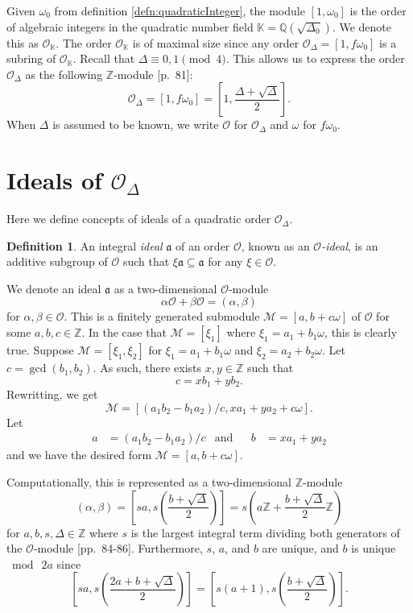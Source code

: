 \documentclass{ucalgthes1}
\theoremstyle{plain}
\theoremstyle{definition}
\newtheorem{defn}[thm]{Definition}
\newcommand{\KK}{\mathbb{K}}
\newcommand{\MM}{\mathcal{M}}
\newcommand{\OO}{\mathcal{O}}
\newcommand{\ZZ}{\mathbb{Z}}
\newcommand{\QQ}{\mathbb{Q}}
\begin{document}
\bigbreak
Given $\omega_0$ from definition \ref{defn:quadraticInteger}, the module $[1, \omega_0]$ is the order of algebraic integers in the quadratic number field $\KK=\QQ(\sqrt{\Delta_0})$.  We denote this as $\OO_{\KK}$.  The order $\OO_\KK$ is of maximal size since any order $\OO_\Delta = [1,f\omega_0]$ is a subring of $\OO_\KK$.  Recall that $\Delta \equiv 0,1 \pmod 4$.  This allows us to express the order $\OO_\Delta$ as the following $\ZZ$-module \cite{Jac09}[p.~81]:
\[
	\OO_\Delta = [1,f\omega_0] = \left[1, \frac{\Delta + \sqrt{\Delta}}{2} \right].
\]
When $\Delta$ is assumed to be known, we write $\OO$ for $\OO_\Delta$ and $\omega$ for $f\omega_0$.


\bigbreak
\section{Ideals of $\OO_\Delta$}

Here we define concepts of ideals of a quadratic order $\OO_\Delta$.

\begin{defn}
An integral \emph{ideal} $\mathfrak{a}$ of an order $\OO$, known as an \emph{$\OO$-ideal}, is an additive subgroup of $\OO$ such that $\xi \mathfrak{a} \subseteq \mathfrak{a}$ for any $\xi \in \OO$.
\end{defn}

We denote an ideal $\mathfrak{a}$ as a two-dimensional $\OO$-module
\[
	\alpha \OO + \beta \OO = (\alpha, \beta)
\]
for $\alpha, \beta \in \OO$.  This is a finitely generated submodule $\MM=[a,b+c\omega]$ of $\OO$ for some $a,b,c \in \ZZ$.  In the case that $\MM = [\xi_1]$ where $\xi_1 = a_1+b_1\omega$, this is clearly true.  Suppose $\MM = [\xi_1, \xi_2]$ for $\xi_1 = a_1 + b_1\omega$ and $\xi_2 = a_2+b_2\omega$.  Let $c = \gcd(b_1, b_2)$.  As such, there exists $x,y \in \ZZ$ such that 
\[
	c = xb_1 + yb_2.
\]
Rewritting, we get
\[
	\MM = [(a_1b_2-b_1a_2)/c, xa_1+ya_2+c\omega].
\]
Let
\begin{align*}
	a &= (a_1b_2-b_1a_2)/c &
	\mbox{and} &&
	b &= xa_1+ya_2
\end{align*}
and we have the desired form $\MM = [a, b+c\omega]$.


Computationally, this is represented as a two-dimensional $\ZZ$-module
\begin{equation}
\label{eq:idealZModule}
	(\alpha, \beta) = \left[sa, s\left( \frac{b+ \sqrt{\Delta}}{2} \right) \right] = s \left(a \ZZ + \frac{b + \sqrt{\Delta}}{2} \ZZ \right)
\end{equation}
for $a,b,s,\Delta \in \ZZ$ where $s$ is the largest integral term dividing both generators of the $\OO$-module \cite{Jac09}[pp.~84-86]. 
Furthermore, $s$, $a$, and $b$ are unique, and $b$ is unique $\bmod~2a$ since
\begin{equation*}
	\left[sa, s\left(\frac{2a+b+\sqrt{\Delta}}{2}\right)\right] = \left[s(a+1), s\left(\frac{b+\sqrt{\Delta}}{2}\right)\right].
\end{equation*}
\end{document}

